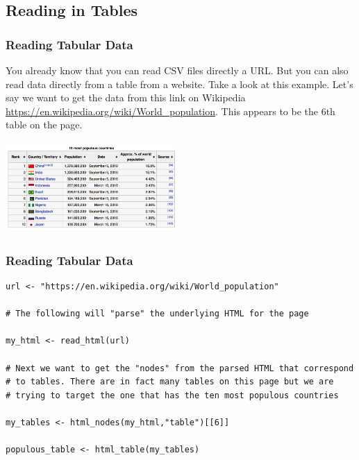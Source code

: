 \documentclass{beamer}
\begin{document}
\subsection{Reading in Tables}
\begin{frame}[fragile]
\frametitle{Reading Tabular Data}
\small
You already know that you can read CSV files directly a URL. But you can also read data directly from a table from a website. Take a look at this example. Let's say we want to get the data from this link on Wikipedia \url{https://en.wikipedia.org/wiki/World_population}. This appears to be the 6th table on the page. 
\begin{center}
\includegraphics[height=3.5cm,width=6.5cm]{../IMG/world_population_wiki.png}
\end{center}
\end{frame}

%
\begin{frame}[fragile]
\frametitle{Reading Tabular Data}
\footnotesize
\begin{verbatim}
url <- "https://en.wikipedia.org/wiki/World_population"

# The following will "parse" the underlying HTML for the page

my_html <- read_html(url)

# Next we want to get the "nodes" from the parsed HTML that correspond 
# to tables. There are in fact many tables on this page but we are 
# trying to target the one that has the ten most populous countries

my_tables <- html_nodes(my_html,"table")[[6]]

populous_table <- html_table(my_tables)
\end{verbatim}

\end{frame}
\end{document}
